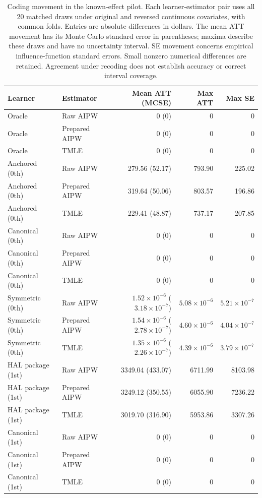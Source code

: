 \begin{table}[p]
\centering
\small
\caption{Coding movement in the known-effect pilot. Each learner-estimator pair uses all 20 matched draws under original and reversed continuous covariates, with common folds. Entries are absolute differences in dollars. The mean ATT movement has its Monte Carlo standard error in parentheses; maxima describe these draws and have no uncertainty interval. SE movement concerns empirical influence-function standard errors. Small nonzero numerical differences are retained. Agreement under recoding does not establish accuracy or correct interval coverage.}
\label{tab:semisynth-movement}

\begin{tabular}{llrrr}
\toprule
Learner & Estimator & Mean ATT (MCSE) & Max ATT & Max SE\\
\midrule
Oracle & Raw AIPW & 0 (0) & 0 & 0\\
Oracle & Prepared AIPW & 0 (0) & 0 & 0\\
Oracle & TMLE & 0 (0) & 0 & 0\\
\addlinespace
Anchored (0th) & Raw AIPW & 279.56 (52.17) & 793.90 & 225.02\\
Anchored (0th) & Prepared AIPW & 319.64 (50.06) & 803.57 & 196.86\\
Anchored (0th) & TMLE & 229.41 (48.87) & 737.17 & 207.85\\
\addlinespace
Canonical (0th) & Raw AIPW & 0 (0) & 0 & 0\\
Canonical (0th) & Prepared AIPW & 0 (0) & 0 & 0\\
Canonical (0th) & TMLE & 0 (0) & 0 & 0\\
\addlinespace
Symmetric (0th) & Raw AIPW & $1.52\times10^{-6}$ ($3.18\times10^{-7}$) & $5.08\times10^{-6}$ & $5.21\times10^{-7}$\\
Symmetric (0th) & Prepared AIPW & $1.54\times10^{-6}$ ($2.78\times10^{-7}$) & $4.60\times10^{-6}$ & $4.04\times10^{-7}$\\
Symmetric (0th) & TMLE & $1.35\times10^{-6}$ ($2.26\times10^{-7}$) & $4.39\times10^{-6}$ & $3.79\times10^{-7}$\\
\addlinespace
HAL package (1st) & Raw AIPW & 3349.04 (433.07) & 6711.99 & 8103.98\\
HAL package (1st) & Prepared AIPW & 3249.12 (350.55) & 6055.90 & 7236.22\\
HAL package (1st) & TMLE & 3019.70 (316.90) & 5953.86 & 3307.26\\
\addlinespace
Canonical (1st) & Raw AIPW & 0 (0) & 0 & 0\\
Canonical (1st) & Prepared AIPW & 0 (0) & 0 & 0\\
Canonical (1st) & TMLE & 0 (0) & 0 & 0\\
\bottomrule
\end{tabular}
\end{table}
